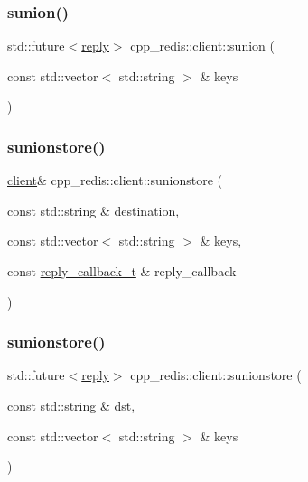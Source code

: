\mbox{\label{classcpp__redis_1_1client_a7f76d091899206932d250edf3f990e94}} 
\subsubsection{\texorpdfstring{sunion()}{sunion()}\hspace{0.1cm}{\footnotesize\ttfamily [2/2]}}
{\footnotesize\ttfamily std\+::future$<$\hyperlink{classcpp__redis_1_1reply}{reply}$>$ cpp\+\_\+redis\+::client\+::sunion (\begin{DoxyParamCaption}\item[{const std\+::vector$<$ std\+::string $>$ \&}]{keys }\end{DoxyParamCaption})}

\mbox{\label{classcpp__redis_1_1client_a26f38c6a8b7f03cd6ec9d5e4d121be32}} 
\subsubsection{\texorpdfstring{sunionstore()}{sunionstore()}\hspace{0.1cm}{\footnotesize\ttfamily [1/2]}}
{\footnotesize\ttfamily \hyperlink{classcpp__redis_1_1client}{client}\& cpp\+\_\+redis\+::client\+::sunionstore (\begin{DoxyParamCaption}\item[{const std\+::string \&}]{destination,  }\item[{const std\+::vector$<$ std\+::string $>$ \&}]{keys,  }\item[{const \hyperlink{classcpp__redis_1_1client_a061a1140d36d2eaeda82b09a0bb3f9f2}{reply\+\_\+callback\+\_\+t} \&}]{reply\+\_\+callback }\end{DoxyParamCaption})}

\mbox{\label{classcpp__redis_1_1client_af71da68029a24b52a5005a24c859893d}} 
\subsubsection{\texorpdfstring{sunionstore()}{sunionstore()}\hspace{0.1cm}{\footnotesize\ttfamily [2/2]}}
{\footnotesize\ttfamily std\+::future$<$\hyperlink{classcpp__redis_1_1reply}{reply}$>$ cpp\+\_\+redis\+::client\+::sunionstore (\begin{DoxyParamCaption}\item[{const std\+::string \&}]{dst,  }\item[{const std\+::vector$<$ std\+::string $>$ \&}]{keys }\end{DoxyParamCaption})}

